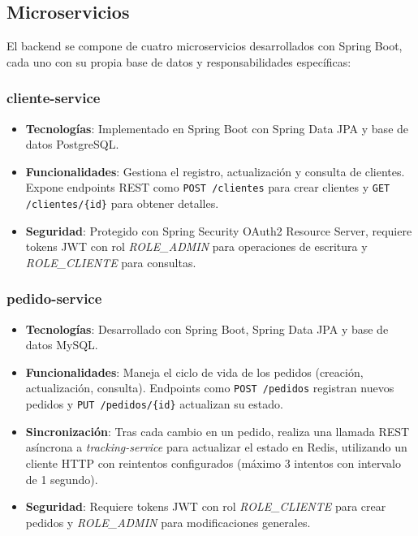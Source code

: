 \documentclass[a4paper,12pt]{article}
\begin{document}
\subsection{Microservicios}
El backend se compone de cuatro microservicios desarrollados con Spring Boot, cada uno con su propia base de datos y responsabilidades específicas:

\subsubsection{cliente-service}
\begin{itemize}
    \item \textbf{Tecnologías}: Implementado en Spring Boot con Spring Data JPA y base de datos PostgreSQL.
    \item \textbf{Funcionalidades}: Gestiona el registro, actualización y consulta de clientes. Expone endpoints REST como \texttt{POST /clientes} para crear clientes y \texttt{GET /clientes/\{id\}} para obtener detalles.
    \item \textbf{Seguridad}: Protegido con Spring Security OAuth2 Resource Server, requiere tokens JWT con rol \textit{ROLE\_ADMIN} para operaciones de escritura y \textit{ROLE\_CLIENTE} para consultas.
\end{itemize}

\subsubsection{pedido-service}
\begin{itemize}
    \item \textbf{Tecnologías}: Desarrollado con Spring Boot, Spring Data JPA y base de datos MySQL.
    \item \textbf{Funcionalidades}: Maneja el ciclo de vida de los pedidos (creación, actualización, consulta). Endpoints como \texttt{POST /pedidos} registran nuevos pedidos y \texttt{PUT /pedidos/\{id\}} actualizan su estado.
    \item \textbf{Sincronización}: Tras cada cambio en un pedido, realiza una llamada REST asíncrona a \textit{tracking-service} para actualizar el estado en Redis, utilizando un cliente HTTP con reintentos configurados (máximo 3 intentos con intervalo de 1 segundo).
    \item \textbf{Seguridad}: Requiere tokens JWT con rol \textit{ROLE\_CLIENTE} para crear pedidos y \textit{ROLE\_ADMIN} para modificaciones generales.
\end{itemize}
\end{document}
